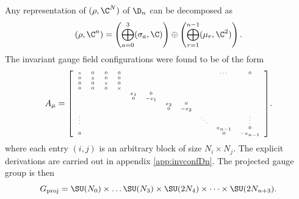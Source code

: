 \documentclass{worksheetclass}
\begin{document}
        Any representation of $(\rho,\C^N)$ of $\D_n$ can be decomposed as
        \begin{equation}
            (\rho,\C^n) = \left( \bigoplus^3_{a=0}(\sigma_a,\C) \right)\oplus\left( \bigoplus^{n-1}_{r=1}(\mu_r,\C^2) \right).
        \end{equation}
        The invariant gauge field configurations were found to be of the form
        \begin{equation}
            A_\mu=
            {\tiny
            \left[
            \begin{array}{*{20}c}
                \times & 0 & 0 & 0 & & & & & & \cdots & 0 \\
                0 & \times & 0 & 0 & & & & & & & \\
                0 & 0 & \times & 0 & & & & & & & \\
                0 & 0 & 0 & \times & & & & & & & \\
                & & & & x_1 & 0 & & & & & \\
                & & & & 0 & -x_1 & & & & & \\
                & & & & & & x_2 & 0 & & & \\
                & & & & & & 0 & -x_2 & & & \\
                \vdots & & & & & & & & \ddots & & \vdots \\
                & & & & & & & & & x_{n-1} & 0 \\
                0 & & & & & & & & & 0 & -x_{n-1}
        \end{array}
        \right]}.\label{eq:invformAmuDn}
        \end{equation}
        where each entry $(i,j)$ is an arbitrary block of size $N_i\times N_j$. The explicit derivations are carried out in appendix \ref{app:invconfDn}. The projected gauge group is then
        \begin{equation}
            G_{\text{proj}} = \SU(N_0)\times\dots\SU(N_3)\times\SU(2N_4)\times\dots\times\SU(2N_{n+3}).
        \end{equation}
\end{document}

